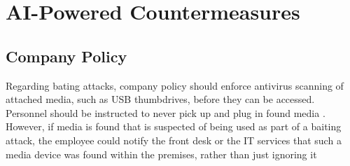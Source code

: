 



\chapter{AI-Powered Countermeasures\label{countermeasures}}


\section{Company Policy}

Regarding bating attacks, company policy should enforce antivirus scanning of attached media, such as USB thumbdrives, before they can be accessed. Personnel should be instructed to never pick up and plug in found media \citep{salahdine_social_2019}. However, if media is found that is suspected of being used as part of a baiting attack, the employee could notify the front desk or the IT services that such a media device was found within the premises, rather than just ignoring it 
